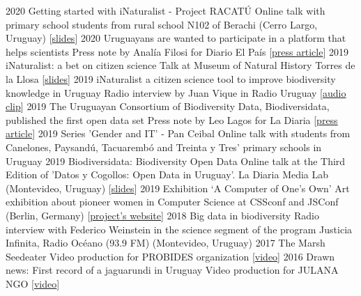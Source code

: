 \documentclass[9pt]{developercv} %
\begin{document}
\begin{entrylist}
	\entrylong
		{2020}
		{Getting started with iNaturalist - Project RACATÚ}
		{}
		{Online talk with primary school students from rural school N102 of Berachi (Cerro Largo, Uruguay) [\href{https://flograttarola.com/pdf/iNat_Berachi.pdf}{slides}]}
	\entrylong
		{2020}
		{Uruguayans are wanted to participate in a platform that helps scientists}
		{}
		{Press note by Analía Filosi for Diario El País [\href{https://www.elpais.com.uy/vida-actual/busca-uruguayos-participen-plataforma-ayuda-cientificos.html}{press article}]}
	\entrylong
		{2019}
		{iNaturalist: a bet on citizen science}
		{}
		{Talk at Museum of Natural History Torres de la Llosa [\href{https://flograttarola.com/pdf/NaturalistaUy.pdf}{slides}]}
	\entrylong
		{2019}
		{iNaturalist a citizen science tool to improve biodiversity knowledge in Uruguay}
		{}
		{Radio interview by Juan Vique in Radio Uruguay [\href{https://sobreciencia.uy/inaturalist-una-apuesta-a-la-ciencia-ciudadana/}{audio clip}]}
	\entrylong
		{2019}
		{The Uruguayan Consortium of Biodiversity Data, Biodiversidata, published the first open data set}
		{}
		{Press note by Leo Lagos for La Diaria [\href{https://ladiaria.com.uy/ciencia/articulo/2019/7/el-consorcio-de-datos-de-biodiversidad-de-uruguay-biodiversidata-publico-el-primer-set-de-datos-abiertos/}{press article}]}
	\entrylong
		{2019}
		{Series 'Gender and IT' -  Pan Ceibal}
		{}
		{Online talk with students from Canelones, Paysandú, Tacuarembó and Treinta y Tres' primary schools in Uruguay}
	\entrylong
		{2019}
		{Biodiversidata: Biodiversity Open Data}
		{}
		{Online talk at the Third Edition of 'Datos y Cogollos: Open Data in Uruguay'. La Diaria Media Lab (Montevideo, Uruguay) [\href{https://flograttarola.com/talk/biodiversidata.-datos-abiertos-de-biodiversidad/Biodiversidata_Datos_y_Cogollos_OCT2019.pdf}{slides}]}
	\entrylong
		{2019}
		{Exhibition ‘A Computer of One’s Own’}
		{}
		{Art exhibition about pioneer women in Computer Science at CSSconf and JSConf (Berlin, Germany) [\href{https://medium.com/a-computer-of-ones-own}{project's website}]}
	\entrylong
		{2018}
		{Big data in biodiversity}
		{}
		{Radio interview with Federico Weinstein in the science segment of the program Justicia Infinita, Radio Océano (93.9 FM) (Montevideo, Uruguay)}
	\entrylong
		{2017}
		{The Marsh Seedeater}
		{}
		{Video production for PROBIDES organization [\href{https://youtu.be/EYKt83ShWQ8}{video}]}
	\entrylong
		{2016}
		{Drawn news: First record of a jaguarundi in Uruguay}
		{}
		{Video production for JULANA NGO [\href{https://youtu.be/Zva9m9hmXCc}{video}]}	
\end{entrylist}
\end{document}
